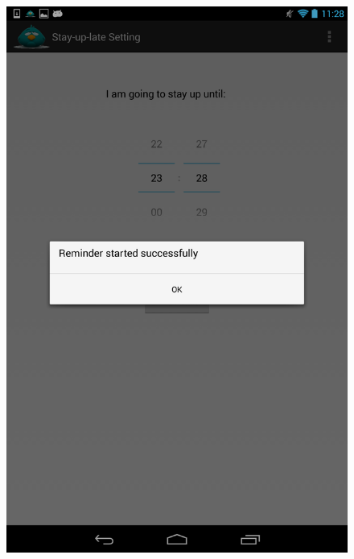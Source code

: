 \documentclass[14pt]{extreport}
\begin{document}
\begin{figure}[h]
\begin{center}
\includegraphics[width=5in]{reminder_started}
\end{center}
\end{figure}
\end{document}
